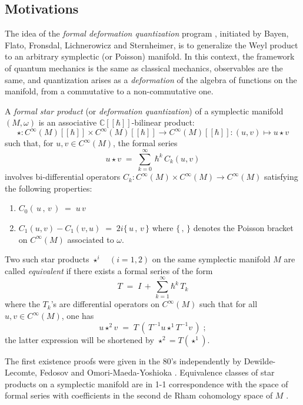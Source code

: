 \documentclass{article}
\def \C{{\mathbb C}}
\begin{document}
\subsection{Motivations}
The idea of the \emph{formal deformation quantization} program \cite{BFFLS}, initiated by Bayen, Flato, Fronsdal, Lichnerowicz and Sternheimer, is to generalize the Weyl product to an arbitrary symplectic (or Poisson) manifold. In this context, the framework of quantum mechanics is the same as classical mechanics, observables are the same, and quantization arises as a \emph{deformation} of the algebra of functions on the manifold, from a commutative to a non-commutative one.

\noindent A {\sl formal star product} (or {\sl deformation quantization}) of a symplectic manifold $(M,\omega)$
is an associative $\C[[\hbar]]$-bilinear product:
\begin{equation}
\star:C^\infty(M)[[\hbar]]\times C^\infty(M)[[\hbar]]\longrightarrow C^\infty(M)[[\hbar]]:(u,v)\mapsto u\star v
\end{equation}
such that, for $u,v\in C^\infty(M)$, the formal series
\begin{equation}\label{DefStar}
u\star v\;=\;\sum_{k=0}^\infty\,\hbar^k\,C_k(u,v)
\end{equation}
involves bi-differential operators $C_k:C^\infty(M)\times C^\infty(M)\to C^\infty(M)$
satisfying the following properties:
\begin{enumerate}
\item[(i)] $C_0(\,u\,,\,v\,)\;=\;u\,v$
\item[(ii)] $C_1(u,v)-C_1(v,u)\;=\;2i\{\,u\,,\,v\,\}$ where $\{\,,\,\}$ denotes the Poisson
bracket on $C^\infty(M)$ associated to $\omega$.
\end{enumerate}
Two such star products $\star^i\quad (i=1,2)$ on the same symplectic manifold $M$ are called {\sl equivalent} if there exists a formal series of the form 
\begin{equation}
T\;=\;I\,+\,\sum_{k=1}^\infty\hbar^k\,T_k
\end{equation}
where the $T_k$'s are differential operators on $C^\infty(M)$ such that for all $u,v\in C^\infty(M)$, one has
\begin{equation}
u\star^2v\;=\;T\,(\,T^{-1}u\star^1T^{-1}v\,)\;;
\end{equation}
the latter expression will be shortened by $\star^2=T(\star^1)$.

\noindent The first existence proofs were given in the 80's independently by Dewilde-Lecomte, Fedosov and 
Omori-Maeda-Yoshioka \cite{DW, Fe, OMY}. 
Equivalence classes of star products on a symplectic manifold are in 1-1 correspondence with the space
of formal series with coefficients in the second de Rham cohomology space of $M$ \cite{BCG, NT}.
\end{document}
